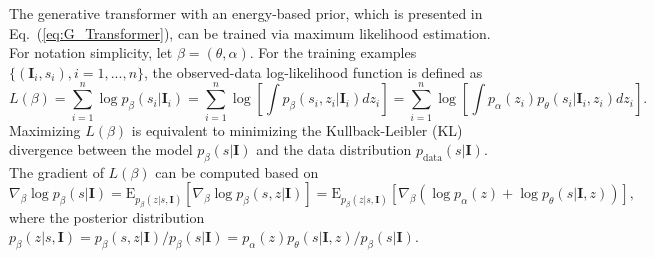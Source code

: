\documentclass{article}
\begin{document}
The generative transformer with an energy-based prior, which is presented in Eq.~(\ref{eq:G_Transformer}), can be trained via maximum likelihood estimation. For notation simplicity, let $\beta=(\theta, \alpha)$. For the training examples $\{(\textbf{I}_i, s_i),i=1,...,n\}$, the observed-data log-likelihood function is defined as
\begin{equation}
    L(\beta)=\sum_{i=1}^{n} \log p_{\beta}(s_i|\textbf{I}_i)=\sum_{i=1}^{n} \log \left[\int p_{\beta}(s_i,z_i|\textbf{I}_i)dz_i \right]=\sum_{i=1}^{n} \log \left[\int p_{\alpha}(z_i)p_{\theta}(s_i|\textbf{I}_i,z_i)dz_i \right]. \nonumber \end{equation}
Maximizing $L(\beta)$ is equivalent to minimizing the Kullback-Leibler (KL) divergence between the model $p_{\beta}(s|\textbf{I})$ and the data distribution $p_{\text{data}}(s|\textbf{I})$. The gradient of $L(\beta)$ can be computed based on
\begin{equation}
    \nabla_{\beta} \log p_{\beta}(s|\textbf{I})= \text{E}_{p_{\beta}(z|s,\textbf{I})} \left[\nabla_{\beta} \log p_{\beta}(s,z|\textbf{I}) \right]=\text{E}_{p_{\beta}(z|s,\textbf{I})}[\nabla_{\beta} (\log p_{\alpha}(z)+  \log p_{\theta}(s|\textbf{I},z))], \label{eq:gradient}
\end{equation}
where the posterior distribution $p_{\beta}(z|s,\textbf{I})=p_{\beta}(s,z|\textbf{I})/p_{\beta}(s|\textbf{I})=p_{\alpha}(z)p_{\theta}(s|\textbf{I},z)/p_{\beta}(s|\textbf{I})$. 
\end{document}
